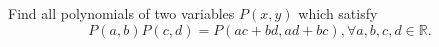 Find all polynomials of two variables $P(x,y)$ which satisfy\[P(a,b) P(c,d) = P (ac+bd, ad+bc), \forall a,b,c,d \in \mathbb{R}.\]